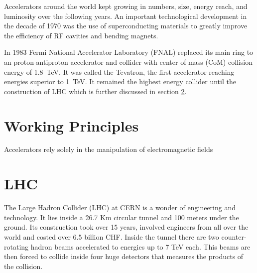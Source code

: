 Accelerators around the world kept growing in numbers, size, energy reach, and
luminosity over the following years. An important technological development in
the decade of 1970 was the use of superconducting materials to greatly improve
the efficiency of RF cavities and bending magnets.

In 1983 Fermi National
Accelerator Laboratory (FNAL) replaced its main ring to an proton-antiproton
accelerator and collider with center of mass (CoM) collision energy of
\SI{1.8}{TeV}. It was called the Tevatron, the first accelerator reaching
energies superior to \SI{1}{TeV}. It remained the highest energy collider until
the construction of LHC which is further discussed in section \ref{lhc}.


\section{Working Principles}
Accelerators rely solely in the manipulation of electromagnetic fields 
\section{LHC}
\label{lhc}
The Large Hadron Collider (LHC) at CERN is a wonder of engineering and
technology. It lies inside a 26.7 Km circular tunnel and 100 meters under the
ground. Its construction took over 15 years, involved engineers from all over
the world and costed over 6.5 billion CHF. Inside the tunnel there are two
counter-rotating hadron beams accelerated to energies up to 7 TeV each. This
beams are then forced to collide inside four huge detectors that measures the
products of the collision\citep{LHCMT}.
